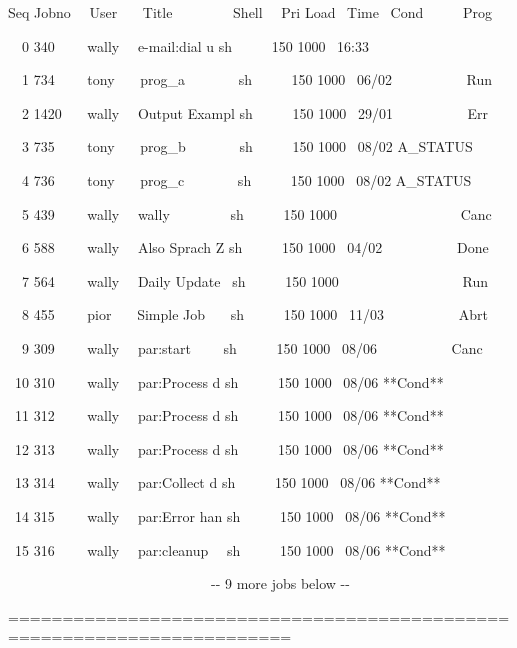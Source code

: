 \begin{exparasmall}

Seq Jobno \ \ User \ \ \ Title \ \ \ \ \ \ \ \ Shell \ \ Pri Load \ Time
\ Cond \ \ \ \ \ Prog

\ \ 0 340 \ \ \ \ wally \ \ e-mail:dial u sh \ \ \ \ \ 150 1000 \ 16:33

\ \ 1 734 \ \ \ \ tony \ \ \ prog\_a \ \ \ \ \ \ \ sh \ \ \ \ \ 150 1000
\ 06/02 \ \ \ \ \ \ \ \ \ \ Run

\ \ 2 1420 \ \ \ wally \ \ Output Exampl sh \ \ \ \ \ 150 1000 \ 29/01
\ \ \ \ \ \ \ \ \ \ Err

\ \ 3 735 \ \ \ \ tony \ \ \ prog\_b \ \ \ \ \ \ \ sh \ \ \ \ \ 150 1000
\ 08/02 A\_STATUS

\ \ 4 736 \ \ \ \ tony \ \ \ prog\_c \ \ \ \ \ \ \ sh \ \ \ \ \ 150 1000
\ 08/02 A\_STATUS

\ \ 5 439 \ \ \ \ wally \ \ wally \ \ \ \ \ \ \ \ sh \ \ \ \ \ 150 1000
\ \ \ \ \ \ \ \ \ \ \ \ \ \ \ \ \ Canc

\ \ 6 588 \ \ \ \ wally \ \ Also Sprach Z sh \ \ \ \ \ 150 1000 \ 04/02
\ \ \ \ \ \ \ \ \ \ Done

\ \ 7 564 \ \ \ \ wally \ \ Daily Update \ sh \ \ \ \ \ 150 1000
\ \ \ \ \ \ \ \ \ \ \ \ \ \ \ \ \ Run

\ \ 8 455 \ \ \ \ pior \ \ \ Simple Job \ \ \ sh \ \ \ \ \ 150 1000
\ 11/03 \ \ \ \ \ \ \ \ \ \ Abrt

\ \ 9 309 \ \ \ \ wally \ \ par:start \ \ \ \ sh \ \ \ \ \ 150 1000
\ 08/06 \ \ \ \ \ \ \ \ \ \ Canc

\ 10 310 \ \ \ \ wally \ \ par:Process d sh \ \ \ \ \ 150 1000 \ 08/06
**Cond**

\ 11 312 \ \ \ \ wally \ \ par:Process d sh \ \ \ \ \ 150 1000 \ 08/06
**Cond**

\ 12 313 \ \ \ \ wally \ \ par:Process d sh \ \ \ \ \ 150 1000 \ 08/06
**Cond**

\ 13 314 \ \ \ \ wally \ \ par:Collect d sh \ \ \ \ \ 150 1000 \ 08/06
**Cond**

\ 14 315 \ \ \ \ wally \ \ par:Error han sh \ \ \ \ \ 150 1000 \ 08/06
**Cond**

\ 15 316 \ \ \ \ wally \ \ par:cleanup \ \ sh \ \ \ \ \ 150 1000 \ 08/06
**Cond**

\ \ \ \ \ \ \ \ \ \ \ \ \ \ \ \ \ \ \ \ \ \ \ \ \ \ \ \ \ {}-{}- 9 more
jobs below -{}-

========================================================================

\end{exparasmall}

